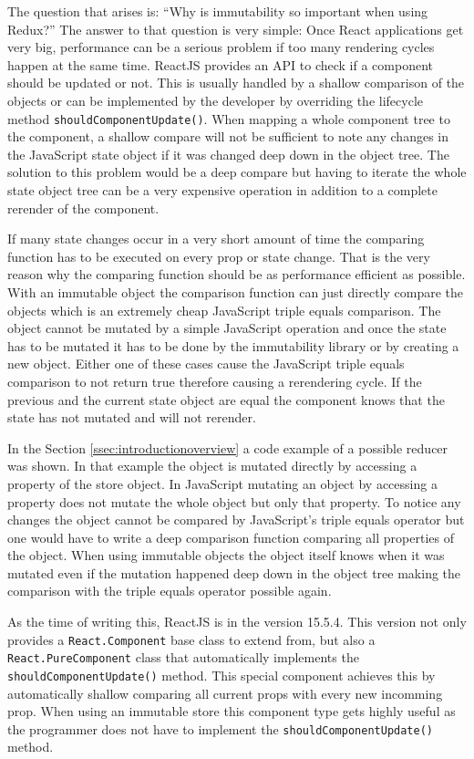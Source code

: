 The question that arises is: \enquote{Why is immutability so important when using Redux?} The answer to that question is very simple: Once React applications get very big, performance can be a serious problem if too many rendering cycles happen at the same time. ReactJS provides an API to check if a component should be updated or not. This is usually handled by a shallow comparison of the objects or can be implemented by the developer by overriding the lifecycle method \texttt{shouldComponentUpdate()}. When mapping a whole component tree to the component, a shallow compare will not be sufficient to note any changes in the JavaScript state object if it was changed deep down in the object tree. The solution to this problem would be a deep compare but having to iterate the whole state object tree can be a very expensive operation in addition to a complete rerender of the component. 

If many state changes occur in a very short amount of time the comparing function has to be executed on every prop or state change. That is the very reason why the comparing function should be as performance efficient as possible. With an immutable object the comparison function can just directly compare the objects which is an extremely cheap JavaScript triple equals comparison. The object cannot be mutated by a simple JavaScript operation and once the state has to be mutated it has to be done by the immutability library or by creating a new object. Either one of these cases cause the JavaScript triple equals comparison to not return true therefore causing a rerendering cycle. If the previous and the current state object are equal the component knows that the state has not mutated and will not rerender.

In the Section \ref{ssec:introductionoverview} a code example of a possible reducer was shown. In that example the object is mutated directly by accessing a property of the store object. In JavaScript mutating an object by accessing a property does not mutate the whole object but only that property. To notice any changes the object cannot be compared by JavaScript's triple equals operator but one would have to write a deep comparison function comparing all properties of the object. When using immutable objects the object itself knows when it was mutated even if the mutation happened deep down in the object tree making the comparison with the triple equals operator possible again.

As the time of writing this, ReactJS is in the version 15.5.4. This version not only provides a \texttt{React.Component} base class to extend from, but also a \texttt{React.PureComponent} class that automatically implements the \texttt{shouldComponentUpdate()} method. This special component achieves this by automatically shallow comparing all current props with every new incomming prop. When using an immutable store this component type gets highly useful as the programmer does not have to implement the \texttt{shouldComponentUpdate()} method.

